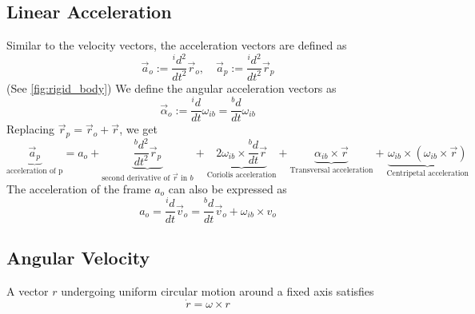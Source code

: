 

\subsection{Linear Acceleration}
Similar to the velocity vectors, the acceleration vectors are defined as
$$
\vec{a}_o:=\frac{^id^2}{dt^2} \vec{r}_o, \quad \vec{a}_p:=\frac{^id^2}{dt^2} \vec{r}_p
$$
(See \autoref{fig:rigid_body})
We define the angular acceleration vectors as
$$
\vec{\alpha}_o:=\frac{^id}{d t} \omega_{ib} = \frac{^bd}{d t} \omega_{ib}
$$
Replacing $\vec r_p=\vec r_o+\vec r$, we get
$$
\underbrace{\vec a_p}_{\text{acceleration of p}} = a_o +
\underbrace{\frac{^bd^2}{dt^2} \vec{r}_p}_{\text{second derivative of } \vec r \text{ in } b} + 
\underbrace{2\omega_{ib}\times \frac{^bd}{dt} \vec{r}}_{\text{Coriolis acceleration}} +
\underbrace{\alpha_{ib}\times \vec r}_{\text{Transversal acceleration}} +
\underbrace{\omega_{ib}\times(\omega_{ib}\times \vec r)}_{\text{Centripetal acceleration}}
$$
The acceleration of the frame $a_o$ can also be expressed as
$$
a_o=\frac{^id}{dt} \vec{v}_o = \frac{^bd}{dt} \vec{v}_o+ \omega_{ib}\times v_o
$$


\subsection{Angular Velocity}
A vector $r$ undergoing uniform circular motion around a fixed axis satisfies
\begin{equation}
    \dot{r} = \omega \times r
    \label{eq:angular_velocity}
\end{equation}


